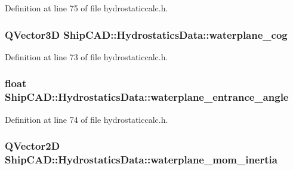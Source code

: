 Definition at line 75 of file hydrostaticcalc.\+h.

\subsubsection[{\texorpdfstring{waterplane\+\_\+cog}{waterplane_cog}}]{\setlength{\rightskip}{0pt plus 5cm}Q\+Vector3D Ship\+C\+A\+D\+::\+Hydrostatics\+Data\+::waterplane\+\_\+cog}\hypertarget{structShipCAD_1_1HydrostaticsData_ac100876d13ae75147585c5c0f80801fe}{}\label{structShipCAD_1_1HydrostaticsData_ac100876d13ae75147585c5c0f80801fe}


Definition at line 73 of file hydrostaticcalc.\+h.

\subsubsection[{\texorpdfstring{waterplane\+\_\+entrance\+\_\+angle}{waterplane_entrance_angle}}]{\setlength{\rightskip}{0pt plus 5cm}float Ship\+C\+A\+D\+::\+Hydrostatics\+Data\+::waterplane\+\_\+entrance\+\_\+angle}\hypertarget{structShipCAD_1_1HydrostaticsData_a3e22cf4f03f02a3c0d14e7f66610fd80}{}\label{structShipCAD_1_1HydrostaticsData_a3e22cf4f03f02a3c0d14e7f66610fd80}


Definition at line 74 of file hydrostaticcalc.\+h.

\subsubsection[{\texorpdfstring{waterplane\+\_\+mom\+\_\+inertia}{waterplane_mom_inertia}}]{\setlength{\rightskip}{0pt plus 5cm}Q\+Vector2D Ship\+C\+A\+D\+::\+Hydrostatics\+Data\+::waterplane\+\_\+mom\+\_\+inertia}\hypertarget{structShipCAD_1_1HydrostaticsData_a2a662521564e9c0160c15acf9d3121f9}{}\label{structShipCAD_1_1HydrostaticsData_a2a662521564e9c0160c15acf9d3121f9}


